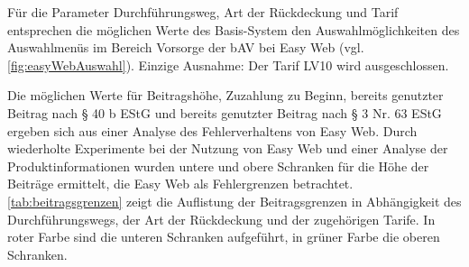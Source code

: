 Für die Parameter Durchführungsweg, Art der Rückdeckung und Tarif entsprechen die möglichen Werte des Basis-System den Auswahlmöglichkeiten des Auswahlmenüs im Bereich \glqq Vorsorge\grqq{} der bAV bei Easy Web (vgl. \autoref{fig:easyWebAuswahl}). Einzige Ausnahme: Der Tarif LV10 wird ausgeschlossen.

Die möglichen Werte für Beitragshöhe, Zuzahlung zu Beginn, bereits genutzter Beitrag nach § 40 b EStG und bereits genutzter Beitrag nach § 3 Nr. 63 EStG ergeben sich aus einer Analyse des Fehlerverhaltens von Easy Web. Durch wiederholte Experimente bei der Nutzung von Easy Web und einer Analyse der Produktinformationen \cite{alh_produkte} wurden untere und obere Schranken für die Höhe der Beiträge ermittelt, die Easy Web als Fehlergrenzen betrachtet. \autoref{tab:beitragsgrenzen} zeigt die Auflistung der Beitragsgrenzen in Abhängigkeit des Durchführungswegs, der Art der Rückdeckung und der zugehörigen Tarife. In roter Farbe sind die unteren Schranken aufgeführt, in grüner Farbe die oberen Schranken.







\renewcommand{\arraystretch}{2.5}

